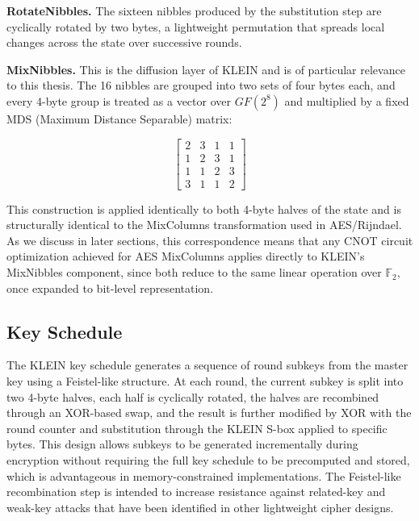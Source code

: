 \textbf{RotateNibbles.} The sixteen nibbles produced by the substitution step are cyclically rotated by two bytes, a lightweight permutation that spreads local changes across the state over successive rounds.

\textbf{MixNibbles.} This is the diffusion layer of KLEIN and is of particular relevance to this thesis. The 16 nibbles are grouped into two sets of four bytes each, and every 4-byte group is treated as a vector over $GF(2^{8})$ and multiplied by a fixed MDS (Maximum Distance Separable) matrix:

\begin{equation}
    \begin{bmatrix}
        2 & 3 & 1 & 1\\
        1 & 2 & 3 & 1\\
        1 & 1 & 2 & 3\\
        3 & 1 & 1 & 2
    \end{bmatrix}
\end{equation}

This construction is applied identically to both 4-byte halves of the state and is structurally identical to the MixColumns transformation used in AES/Rijndael. As we discuss in later sections, this correspondence means that any CNOT circuit optimization achieved for AES MixColumns applies directly to KLEIN's MixNibbles component, since both reduce to the same linear operation over $\mathbb{F}_{2}$, once expanded to bit-level representation.

\subsection{Key Schedule}
The KLEIN key schedule generates a sequence of round subkeys from the master key using a Feistel-like structure. At each round, the current subkey is split into two 4-byte halves, each half is cyclically rotated, the halves are recombined through an XOR-based swap, and the result is further modified by XOR with the round counter and substitution through the KLEIN S-box applied to specific bytes. This design allows subkeys to be generated incrementally during encryption without requiring the full key schedule to be precomputed and stored, which is advantageous in memory-constrained implementations. The Feistel-like recombination step is intended to increase resistance against related-key and weak-key attacks that have been identified in other lightweight cipher designs.

